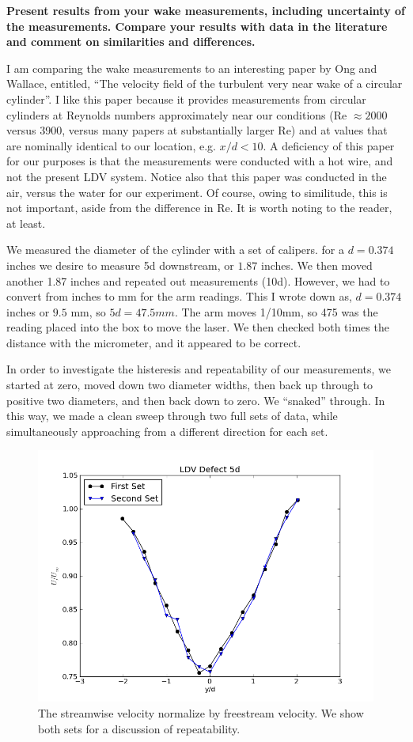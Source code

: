 \documentclass{article}
\begin{document}
\textbf{Present results from your wake measurements, including
uncertainty of the measurements. Compare your results with data in the
literature and comment on similarities and differences. } 

I am comparing the wake measurements to an interesting paper by Ong and
Wallace, entitled, ``The velocity field of the turbulent very near wake
of a circular cylinder''. I like this paper because it provides
measurements from circular cylinders at Reynolds numbers approximately
near our conditions (Re $\approx 2000$ versus 3900, versus many papers
at substantially larger Re) and at values that are nominally identical
to our location, e.g. $x/d < 10$. A deficiency of this paper for our
purposes is that the measurements were conducted with a hot wire, and
not the present LDV system. Notice also that this paper was conducted in the air, 
versus the water for our experiment. Of course, owing to similitude, this is not
important, aside from the difference in Re. It is worth noting to the reader, at least. 

We measured the diameter of the cylinder with a set of calipers. 
for a $d=0.374$ inches we desire to measure 5d downstream, or $1.87$
inches. We then moved another 1.87 inches and repeated out measurements
(10d). However, we had to convert from inches to mm for the arm
readings. This I wrote down as, $d=0.374$ inches or $9.5$ mm, so $5d =
47.5 mm$. The arm moves 1/10mm, so 475 was the reading placed into the
box to move the laser. We then checked both times the distance with the
micrometer, and it appeared to be correct. 

In order to investigate the histeresis and repeatability of our
measurements, we started at zero, moved down two diameter widths, then
back up through to positive two diameters, and then back down to
zero. We ``snaked'' through. In this way, we made a clean sweep through
two full sets of data, while simultaneously approaching from a different
direction for each set. 

\begin{figure}[!htb]
 \begin{center}
  \includegraphics[width = 12 cm]{figs/defect}
  \caption{The streamwise velocity normalize by freestream velocity. We
  show both sets for a discussion of repeatability.}
  \label{repeat}
 \end{center}
\end{figure}
\end{document}
